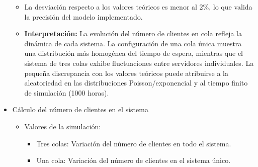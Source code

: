 \documentclass{article}
\begin{document}
\begin{itemize}
\begin{itemize}
            \newpage
        
            \item La desviación respecto a los valores teóricos es menor al 2\%, lo que valida la precisión del modelo implementado.
        
            \item \textbf{Interpretación:} La evolución del número de clientes en cola refleja la dinámica de cada sistema. La configuración de una cola única muestra una distribución más homogénea del tiempo de espera, mientras que el sistema de tres colas exhibe fluctuaciones entre servidores individuales. La pequeña discrepancia con los valores teóricos puede atribuirse a la aleatoriedad en las distribuciones Poisson/exponencial y al tiempo finito de simulación (1000 horas).
        \end{itemize}

    \item Cálculo del número de clientes en el sistema
        \begin{itemize}
            \item Valores de la simulación:
                \begin{itemize}
                    \item Tres colas: Variación del número de clientes en todo el sistema.
                    \item Una cola: Variación del número de clientes en el sistema único.
                \end{itemize}
        

\end{itemize}
\end{itemize}
\end{document}
